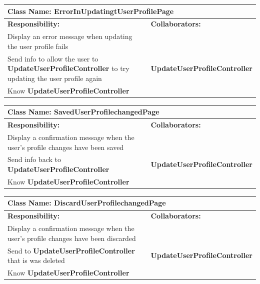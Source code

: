 \documentclass[]{article}
\begin{document}
    \begin{table}[H]
        \centering
        \begin{tabular}{|p{5cm}|p{5cm}|}
        \hline 
         \multicolumn{2}{|l|}{\textbf{Class Name:} ErrorInUpdatingtUserProfilePage} \\
        \hline
        \textbf{Responsibility:} & \textbf{Collaborators:} \\
        \hline
        Display an error message when updating the user profile fails & \phantom{} \\
        \hline
        Send info to allow the user to \textbf{UpdateUserProfileController} to try updating the user profile again & \textbf{UpdateUserProfileController} \\
        \hline
         Know \textbf{UpdateUserProfileController} & \phantom{} \\
        \hline
      
        \end{tabular}
    \end{table}
    

\begin{table}[H]
        \centering
        \begin{tabular}{|p{5cm}|p{5cm}|}
        \hline 
         \multicolumn{2}{|l|}{\textbf{Class Name:} SavedUserProfilechangedPage} \\
        \hline
        \textbf{Responsibility:} & \textbf{Collaborators:} \\
        \hline
        Display a confirmation message when the user's profile changes have been saved & \phantom{} \\
        \hline
        Send info back to \textbf{UpdateUserProfileController}  & \textbf{UpdateUserProfileController} \\
        \hline
         Know \textbf{UpdateUserProfileController} & \phantom{} \\
        \hline
        
        \end{tabular}
    \end{table}



\begin{table}[H]
        \centering
        \begin{tabular}{|p{5cm}|p{5cm}|}
        \hline 
         \multicolumn{2}{|l|}{\textbf{Class Name:} DiscardUserProfilechangedPage} \\
        \hline
        \textbf{Responsibility:} & \textbf{Collaborators:} \\
        \hline
       Display a confirmation message when the user's profile changes have been discarded & \phantom{} \\
        \hline
        Send to \textbf{UpdateUserProfileController} that is was deleted & \textbf{UpdateUserProfileController} \\
        \hline
        Know \textbf{UpdateUserProfileController} & \phantom{} \\
        \hline
        
        \end{tabular}
    \end{table}
\end{document}
